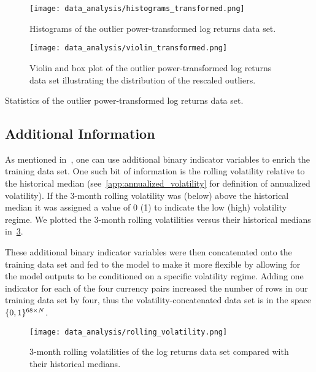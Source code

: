 \begin{figure}[!htb]
    \begin{center}
        \texttt{[image: data\_analysis/histograms\_transformed.png]}
    \end{center}
    \caption{Histograms of the outlier power-transformed log returns data set.}
    \label{fig:histograms_transformed}
\end{figure}
\begin{figure}[!htb]
    \begin{center}
        \texttt{[image: data\_analysis/violin\_transformed.png]}
    \end{center}
    \caption{Violin and box plot of the outlier power-transformed log returns data set illustrating the distribution of the rescaled outliers.}
    \label{fig:violin_transformed}
\end{figure}
\begin{table}[!htb]
    \centering
    \begin{adjustbox}{max width=\textwidth}
        
    \end{adjustbox}
    \caption{Statistics of the outlier power-transformed log returns data set.}
    \label{tbl:data_log_returns_transformed_stats}
\end{table}

\subsection{Additional Information}
As mentioned in~\cite{kondratyev_2019}, one can use additional binary indicator variables to enrich the training data set.
One such bit of information is the rolling volatility relative to the historical median (see~\cref{app:annualized_volatility} for definition of annualized volatility).
If the 3-month rolling volatility was (below) above the historical median it was assigned a value of 0 (1) to indicate the low (high) volatility regime.
We plotted the 3-month rolling volatilities versus their historical medians in~\cref{fig:rolling_volatility}.

These additional binary indicator variables were then concatenated onto the training data set and fed to the model to make it more flexible by allowing for the model outputs to be conditioned on a specific volatility regime.
Adding one indicator for each of the four currency pairs increased the number of rows in our training data set by four, thus the volatility-concatenated data set is in the space \( \{0,1\}^{68 \times N} \).

\begin{figure}[!htb]
    \begin{center}
        \texttt{[image: data\_analysis/rolling\_volatility.png]}
    \end{center}
    \caption{3-month rolling volatilities of the log returns data set compared with their historical medians.}
    \label{fig:rolling_volatility}
\end{figure}
